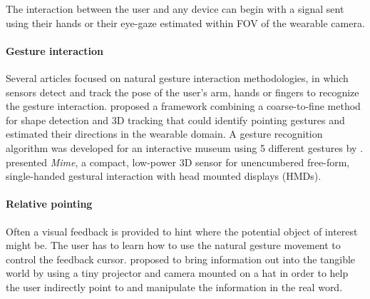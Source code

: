 The interaction between the user and any device can begin with a signal sent using their hands or their eye-gaze estimated within FOV of the wearable camera.

\paragraph{Gesture interaction} Several articles focused on natural gesture interaction methodologies, in which sensors detect and track the pose of the user's arm, hands or fingers to recognize the gesture interaction.
\citet{DeCampos2006} proposed a framework combining a coarse-to-fine method for shape detection and 3D tracking that could identify pointing gestures and estimated their directions in the wearable domain. A gesture recognition algorithm was developed for an interactive museum using 5 different gestures by  \citet{Garcia-Rodriguez2011}. 
\citet{Colaco2013a} presented \textit{Mime}, a compact, low-power 3D sensor for unencumbered free-form, single-handed gestural interaction with head mounted displays (HMDs).

\paragraph{Relative pointing} Often a visual feedback is provided to hint where the potential object of interest might be. The user has to learn how to use the natural gesture movement to control the feedback cursor.
\citet{Mistry2009} proposed to bring information out into the tangible world by using a tiny projector and camera mounted on a hat in order to help the user indirectly point to and manipulate the information in the real word.

